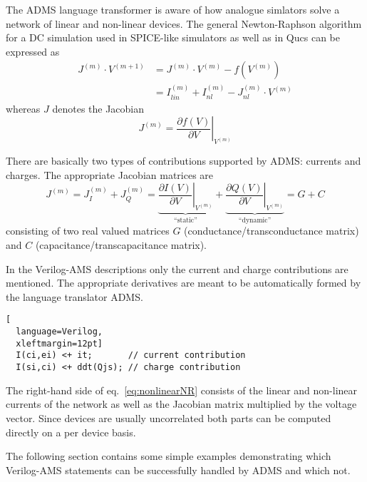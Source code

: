 The ADMS language transformer is aware of how analogue simlators solve
a network of linear and non-linear devices.  The general
Newton-Raphson algorithm for a DC simulation used in SPICE-like
simulators as well as in Qucs can be expressed as
\begin{equation}
\begin{split}
\label{eq:nonlinearNR}
J^{(m)}\cdot V^{(m+1)} &= J^{(m)}\cdot V^{(m)} - f\left(V^{(m)}\right)\\
&= I_{lin}^{(m)} + I_{nl}^{(m)} - J_{nl}^{(m)}\cdot V^{(m)}
\end{split}
\end{equation}
whereas $J$ denotes the Jacobian
\begin{equation}
J^{(m)} = \left.\dfrac{\partial f\left(V\right)}{\partial V}\right|_{V^{(m)}}
\end{equation}

There are basically two types of contributions supported by ADMS:
currents and charges.  The appropriate Jacobian matrices are
\begin{equation}
J^{(m)}
= J_I^{(m)} + J_Q^{(m)}
= \underbrace{\left.\dfrac{\partial I\left(V\right)}{\partial V}\right|_{V^{(m)}}}_{\textrm{``static''}} + \underbrace{\left.\dfrac{\partial Q\left(V\right)}{\partial V}\right|_{V^{(m)}}}_{\textrm{``dynamic''}}
= G + C
\end{equation}
consisting of two real valued matrices $G$
(conductance/transconductance matrix) and $C$
(capacitance/transcapacitance matrix).

\addvspace{12pt}

In the Verilog-AMS descriptions only the current and charge
contributions are mentioned.  The appropriate derivatives are meant to
be automatically formed by the language translator ADMS.
\begin{lstlisting}[
  language=Verilog,
  xleftmargin=12pt]
  I(ci,ei) <+ it;       // current contribution
  I(si,ci) <+ ddt(Qjs); // charge contribution
\end{lstlisting}

The right-hand side of eq.~\eqref{eq:nonlinearNR} consists of the
linear and non-linear currents of the network as well as the Jacobian
matrix multiplied by the voltage vector.  Since devices are usually
uncorrelated both parts can be computed directly on a per device
basis.


The following section contains some simple examples demonstrating
which Verilog-AMS statements can be successfully handled by ADMS and
which not.

